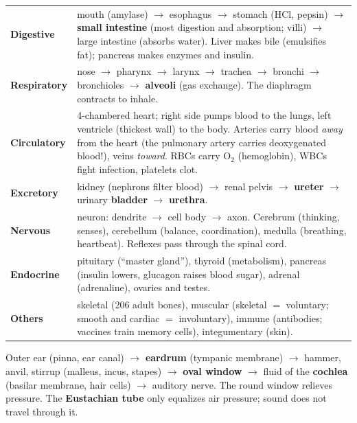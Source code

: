 \documentclass[10pt]{article}
\makeatletter
\renewcommand{\arraystretch}{1.12}
\newcommand{\sub}[1]{\par\vspace{2.5pt}{\sffamily\bfseries\color{dblue}#1}\par\nobreak\vspace{0.5pt}\@afterheading}
\newcounter{fig}
\makeatother
\begin{document}
\begin{multicols}{2}
\sub{J. Human body systems}
{\footnotesize\renewcommand{\arraystretch}{1.04}
\begin{tabularx}{\linewidth}{@{}>{\leavevmode\bfseries\color{dnavy}}p{0.78in}L@{}}
\toprule
Digestive & mouth (amylase) $\to$ esophagus $\to$ stomach (HCl, pepsin) $\to$ \textbf{small intestine} (most digestion and absorption; villi) $\to$ large intestine (absorbs water). Liver makes bile (emulsifies fat); pancreas makes enzymes and insulin.\\
Respiratory & nose $\to$ pharynx $\to$ larynx $\to$ trachea $\to$ bronchi $\to$ bronchioles $\to$ \textbf{alveoli} (gas exchange). The diaphragm contracts to inhale.\\
Circulatory & 4-chambered heart; right side pumps blood to the lungs, left ventricle (thickest wall) to the body. Arteries carry blood \emph{away} from the heart (the pulmonary artery carries deoxygenated blood!), veins \emph{toward}. RBCs carry O$_2$ (hemoglobin), WBCs fight infection, platelets clot.\\
Excretory & kidney (nephrons filter blood) $\to$ renal pelvis $\to$ \textbf{ureter} $\to$ urinary \textbf{bladder} $\to$ \textbf{urethra}.\\
Nervous & neuron: dendrite $\to$ cell body $\to$ axon. Cerebrum (thinking, senses), cerebellum (balance, coordination), medulla (breathing, heartbeat). Reflexes pass through the spinal cord.\\
Endocrine & pituitary (``master gland''), thyroid (metabolism), pancreas (insulin lowers, glucagon raises blood sugar), adrenal (adrenaline), ovaries and testes.\\
Others & skeletal (206 adult bones), muscular (skeletal $=$ voluntary; smooth and cardiac $=$ involuntary), immune (antibodies; vaccines train memory cells), integumentary (skin).\\\bottomrule
\end{tabularx}}
\begin{keybox}
Outer ear (pinna, ear canal) $\to$ \textbf{eardrum} (tympanic membrane) $\to$ hammer, anvil, stirrup (malleus, incus, stapes) $\to$ \textbf{oval window} $\to$ fluid of the \textbf{cochlea} (basilar membrane, hair cells) $\to$ auditory nerve. The round window relieves pressure. The \textbf{Eustachian tube} only equalizes air pressure; sound does not travel through it.
\end{keybox}


\end{multicols}
\end{document}
